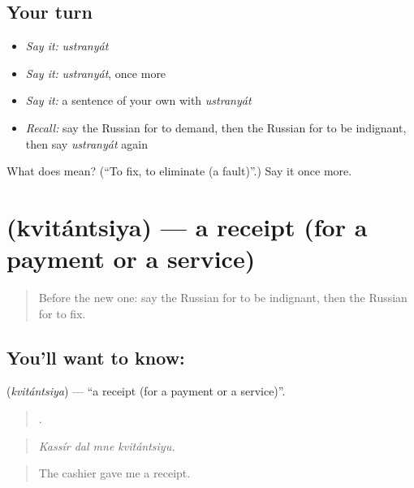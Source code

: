 \subsection*{Your turn}
\begin{itemize}
\raggedright
  \item \emph{Say it:} \emph{ustranyát}
  \item \emph{Say it:} \emph{ustranyát}, once more
  \item \emph{Say it:} a sentence of your own with \emph{ustranyát}
  \item \emph{Recall:} say the Russian for to demand, then the Russian for to be indignant, then say \emph{ustranyát} again
\end{itemize}

\begin{tcolorbox}[breakable,colback=teal!4,colframe=teal!35!black,title={Before you move on}]
What does  mean? (\textquotedblleft{}To fix, to eliminate (a fault)\textquotedblright{}.) Say it once more.
\end{tcolorbox}
\section[\texorpdfstring{\ru{квитанция} (kvitántsiya)}{квитанция (kvitántsiya)}]{ (kvitántsiya) — a receipt (for a payment or a service)}

\label{lesson:RU-C436-kvitantsiya}



\begin{quote}
Before the new one: say the Russian for to be indignant, then the Russian for to fix.
\end{quote}

\subsection*{You'll want to know: }
\textbf{} (\emph{kvitántsiya}) — \textquotedblleft{}a receipt (for a payment or a service)\textquotedblright{}.

\begin{quote}
   .
\end{quote}

\begin{quote}
\emph{Kassír dal mne kvitántsiyu.}
\end{quote}

\begin{quote}
The cashier gave me a receipt.
\end{quote}

